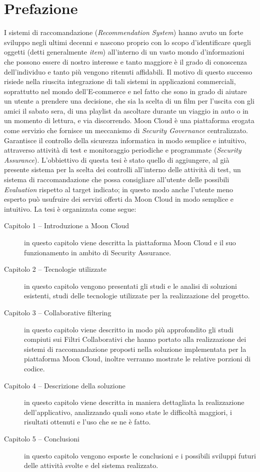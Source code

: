 \chapter{Prefazione}\label{chp:00-prefaction}
I sistemi di raccomandazione (\textit{Recommendation System}) hanno avuto un forte sviluppo negli ultimi decenni e
nascono proprio con lo scopo d'identificare quegli oggetti (detti generalmente \textit{item}) all'interno di un vasto 
mondo d'informazioni che possono essere di nostro interesse e tanto maggiore è il grado di conoscenza dell'individuo 
e tanto più vengono ritenuti affidabili.\hfill\break
Il motivo di questo successo risiede nella riuscita integrazione di tali sistemi in applicazioni commerciali, 
soprattutto nel mondo dell’E-commerce e nel fatto che sono in grado di aiutare un utente a prendere una decisione, che sia la scelta di 
un film per l'uscita con gli amici il sabato sera, di una playlist da ascoltare durante un viaggio in auto o in un momento di lettura, 
e via discorrendo.\hfill\break
Moon Cloud è una piattaforma erogata come servizio che fornisce un meccanismo di \textit{Security Governance} centralizzato. 
Garantisce il controllo della sicurezza informatica in modo semplice e intuitivo, attraverso attività di test e monitoraggio 
periodiche e programmate (\textit{Security Assurance}). L'obbiettivo di questa tesi è stato quello di aggiungere, al già 
presente sistema per la scelta dei controlli all'interno delle attività di test, un sistema di raccomandazione che possa 
consigliare all'utente delle possibili \textit{Evaluation} rispetto al target indicato; in questo modo anche l'utente meno esperto può 
usufruire dei servizi offerti da Moon Cloud in modo semplice e intuitivo.  
\vspace{0.5cm}
\hfill\break
La tesi è organizzata come segue:
\begin{description}
    \item[Capitolo 1 -- Introduzione a Moon Cloud] in questo capitolo viene descritta la piattaforma Moon Cloud e il suo funzionamento
    in ambito di Security Assurance. 
    \item[Capitolo 2 -- Tecnologie utilizzate] in questo capitolo vengono presentati gli studi e le analisi di soluzioni esistenti, 
    studi delle tecnologie utilizzate per la realizzazione del progetto.
    \item[Capitolo 3 -- Collaborative filtering] in questo capitolo viene descritto in modo più approfondito gli studi compiuti sui
    Filtri Collaborativi che hanno portato alla realizzazione dei sistemi di raccomandazione proposti nella soluzione implementata 
    per la piattaforma Moon Cloud, inoltre verranno mostrate le relative porzioni di codice. 
    \item[Capitolo 4 -- Descrizione della soluzione] in questo capitolo viene descritta in maniera dettagliata la realizzazione 
    dell'applicativo, analizzando quali sono state le difficoltà maggiori, i risultati ottenuti e l'uso che se ne è fatto. 
    \item[Capitolo 5 -- Conclusioni] in questo capitolo vengono esposte le conclusioni e i possibili sviluppi futuri delle attività
    svolte e del sistema realizzato.
\end{description}
